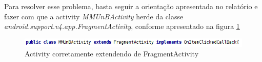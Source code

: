 Para resolver esse problema, basta seguir a orientação apresentada no relatório
e fazer com que a activity {\it MMUnBActivity} herde da classe
{\it android.support.v4.app.FragmentActivity}, conforme apresentado na figura
\ref{herda_FragmentActivity}

\begin{figure}[h]
    \centering
    \includegraphics[width=15cm]{img/heranca_FragmentActivity.png}
    \caption{Activity corretamente extendendo de FragmentActivity}
    \label{herda_FragmentActivity}
\end{figure}


